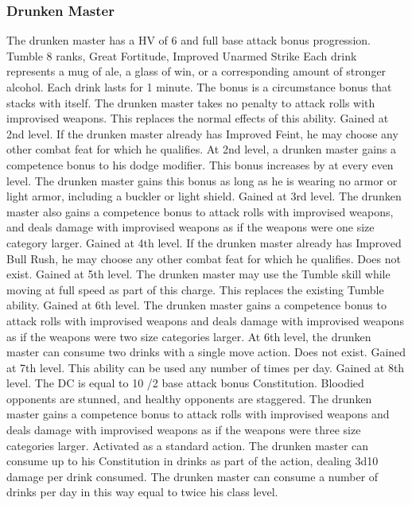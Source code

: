 \subsubsection{Drunken Master}
 The drunken master has a HV of 6 and full base attack bonus progression.
 Tumble 8 ranks, Great Fortitude, Improved Unarmed Strike
 Each drink represents a mug of ale, a glass of win, or a corresponding amount of stronger alcohol. Each drink lasts for 1 minute. The bonus is a circumstance bonus that stacks with itself.
 The drunken master takes no penalty to attack rolls with improvised weapons. This replaces the normal effects of this ability.
 Gained at 2nd level. If the drunken master already has Improved Feint, he may choose any other combat feat for which he qualifies.
 At 2nd level, a drunken master gains a  competence bonus to his dodge modifier. This bonus increases by  at every even level. The drunken master gains this bonus as long as he is wearing no armor or light armor, including a buckler or light shield.
 Gained at 3rd level. The drunken master also gains a  competence bonus to attack rolls with improvised weapons, and deals damage with improvised weapons as if the weapons were one size category larger.
 Gained at 4th level. If the drunken master already has Improved Bull Rush, he may choose any other combat feat for which he qualifies.
 Does not exist.
 Gained at 5th level. The drunken master may use the Tumble skill while moving at full speed as part of this charge. This replaces the existing Tumble ability.
 Gained at 6th level. The drunken master gains a  competence bonus to attack rolls with improvised weapons and deals damage with improvised weapons as if the weapons were two size categories larger.
 At 6th level, the drunken master can consume two drinks with a single move action.
 Does not exist.
 Gained at 7th level. This ability can be used any number of times per day.
 Gained at 8th level. The DC is equal to 10 /2 base attack bonus \add Constitution. Bloodied opponents are stunned, and healthy opponents are staggered.
 The drunken master gains a  competence bonus to attack rolls with improvised weapons and deals damage with improvised weapons as if the weapons were three size categories larger.
 Activated as a standard action. The drunken master can consume up to his Constitution in drinks as part of the action, dealing 3d10 damage per drink consumed. The drunken master can consume a number of drinks per day in this way equal to twice his class level.
